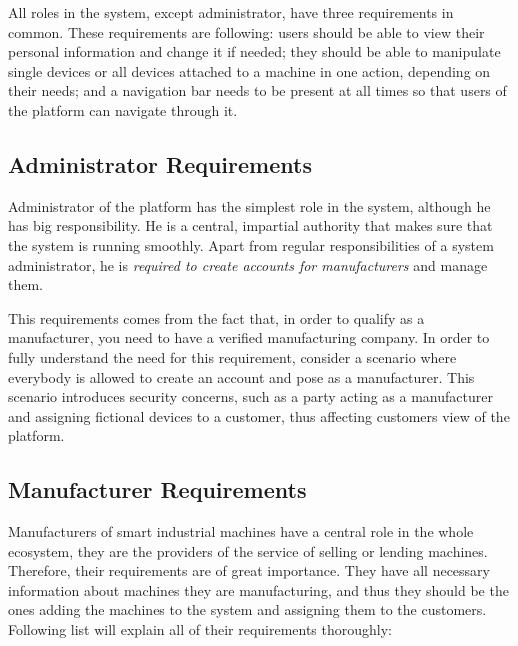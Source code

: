 All roles in the system, except administrator, have three requirements in common. These requirements are following: users should be able to view their personal information and change it if needed; they should be able to manipulate single devices or all devices attached to a machine in one action, depending on their needs; and a navigation bar needs to be present at all times so that users of the platform can navigate through it.

\subsection{Administrator Requirements}

Administrator of the platform has the simplest role in the system, although he has big responsibility. He is a central, impartial authority that makes sure that the system is running smoothly. Apart from regular responsibilities of a system administrator, he is \emph{required to create accounts for manufacturers} and manage them.

This requirements comes from the fact that, in order to qualify as a manufacturer, you need to have a verified manufacturing company. In order to fully understand the need for this requirement, consider a scenario where everybody is allowed to create an account and pose as a manufacturer. This scenario introduces security concerns, such as a party acting as a manufacturer and assigning fictional devices to a customer, thus affecting customers view of the platform.

\subsection{Manufacturer Requirements}

Manufacturers of smart industrial machines have a central role in the whole ecosystem, they are the providers of the service of selling or lending machines. Therefore, their requirements are of great importance. They have all necessary information about machines they are manufacturing, and thus they should be the ones adding the machines to the system and assigning them to the customers. Following list will explain all of their requirements thoroughly:

